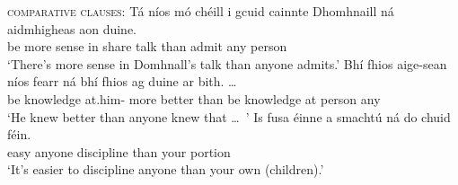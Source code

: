 \documentclass[output=paper,colorlinks,citecolor=brown]{langscibook}
\begin{document}
\newpage
\ea
\textsc{comparative clauses}:
\ea
\gll Tá {níos mó} chéill i gcuid cainnte Dhomhnaill ná aidmhigheas aon duine. \\
    {be\pres} more {sense\gen} in share {talk\gen} {} than {admit\presrel} any person \\
\glt `There's more sense in Domhnall's talk than anyone admits.'
\ex
\gll Bhí fhios aige-sean níos fearr ná bhí fhios ag duine {ar bith.} \ldots\ \\
     {be\past} knowledge {at.him-\contr} {more} better than {be\past} knowledge at person any {} \\
\glt `He knew better than anyone knew that \ldots\ '
\ex
\gll Is fusa éinne a smachtú ná do chuid féin. \\
     {\cop} {easy\er} anyone {\vce} {discipline\vn} than your portion {\fein} \\
\glt `It's easier to discipline anyone than your own (children).'
\z
\z

\end{document}
